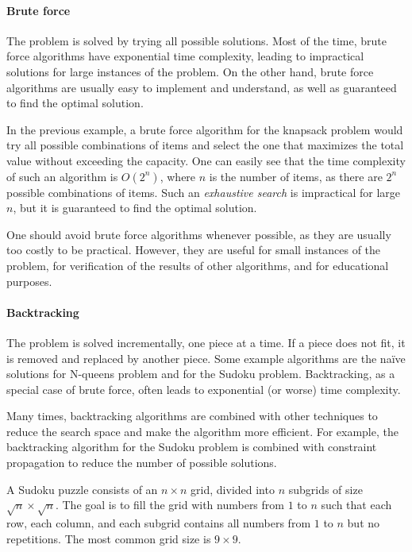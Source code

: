 \paragraph{Brute force}  The problem is solved by trying all possible solutions.  Most of
the time, brute force algorithms have exponential time complexity, leading to impractical
solutions for large instances of the problem.  On the other hand, brute force algorithms
are usually easy to implement and understand, as well as guaranteed to find the optimal
solution.

In the previous example, a brute force algorithm for the knapsack problem would
try all possible combinations of items and select the one that maximizes the total value
without exceeding the capacity.  One can easily see that the time complexity of such an
algorithm is $O(2^n)$, where $n$ is the number of items, as there are $2^n$ possible
combinations of items.  Such an \emph{exhaustive search} is impractical for large $n$,
but it is guaranteed to find the optimal solution.

One should avoid brute force algorithms whenever possible, as they are usually too costly
to be practical.  However, they are useful for small instances of the problem, for
verification of the results of other algorithms, and for educational purposes.

\paragraph{Backtracking}  The problem is solved incrementally, one piece at a time.  If a
piece does not fit, it is removed and replaced by another piece.  Some example algorithms
are the naïve solutions for N-queens problem and for the Sudoku problem.  Backtracking, as
a special case of brute force, often leads to exponential (or worse) time complexity.

Many times, backtracking algorithms are combined with other techniques to reduce the
search space and make the algorithm more efficient.  For example, the backtracking
algorithm for the Sudoku problem is combined with constraint propagation to reduce the
number of possible solutions.

A Sudoku puzzle consists of an $n \times n$ grid, divided into $n$ subgrids of size
$\sqrt{n} \times \sqrt{n}$.  The goal is to fill the grid with numbers from $1$ to $n$
such that each row, each column, and each subgrid contains all numbers from $1$ to $n$ but
no repetitions.  The most common grid size is $9 \times 9$.

